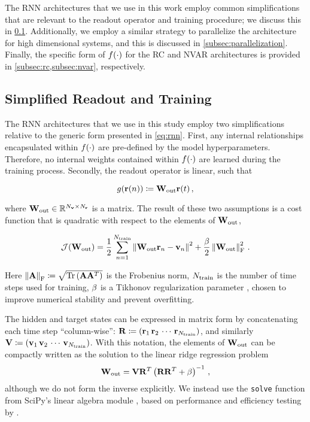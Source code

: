 The RNN architectures that we use in this work employ common
simplifications that are relevant to the readout operator and training
procedure; we discuss this in \cref{subsec:readout}.
Additionally, we employ a similar strategy to parallelize the architecture for
high dimensional systems, and this is discussed in
\cref{subsec:parallelization}.
Finally, the specific form of $f(\cdot)$ for the RC and NVAR architectures
is provided in \cref{subsec:rc,subsec:nvar},
respectively.


\subsection{Simplified Readout and Training}
\label{subsec:readout}

The RNN architectures that we use in this study employ two
simplifications relative to the generic form presented in
\cref{eq:rnn}.
First, any internal relationships encapsulated within
$f(\cdot)$ are pre-defined by the model hyperparameters.
Therefore, no internal weights contained within $f(\cdot)$
are learned during the training process.
Secondly, the readout operator is linear, such that
\begin{linenomath*}\begin{equation*}
    g(\mathbf{r}(n)) \coloneqq \mathbf{W}_\text{out} \mathbf{r}(t) \, ,
\end{equation*}\end{linenomath*}
where $\mathbf{W}_\text{out} \in \mathbb{R}^{N_{\mathbf{v}}\times N_{\mathbf{r}}}$ is a matrix.
The result of these two assumptions is a cost function that is quadratic with
respect to the elements of $\mathbf{W}_\text{out}$,
\begin{linenomath*}\begin{equation}
    \mathcal{J}(\mathbf{W}_\text{out}) =
        \dfrac{1}{2}\sum_{n=1}^{N_\text{train}} \left\lVert\mathbf{W}_\text{out} \mathbf{r}_n - \mathbf{v}_n\right\rVert^2
        +
        \dfrac{\beta}{2}\left\lVert\mathbf{W}_\text{out}\right\rVert_\text{F}^2 \, .
    \label{eq:cost}
\end{equation}\end{linenomath*}
Here
$\left\lVert\mathbf{A}\right\rVert_\text{F} \coloneqq
\sqrt{\text{Tr}\left(\mathbf{A}\mathbf{A}^T\right)}$
is the Frobenius norm,
$N_\text{train}$ is the number of time steps used for training,
$\beta$ is a Tikhonov regularization parameter \citep{tikhonov_solution_1963}, chosen to improve
numerical stability and prevent overfitting.

The hidden and target states can be expressed in matrix form by concatenating
each time step ``column-wise'':
$\mathbf{R} \coloneqq (\mathbf{r}_1 \, \mathbf{r}_2 \, \cdots \, \mathbf{r}_{N_\text{train}})$,
and similarly
$\mathbf{V} \coloneqq (\mathbf{v}_1 \, \mathbf{v}_2 \, \cdots \, \mathbf{v}_{N_\text{train}})$.
With this notation, the elements of $\mathbf{W}_\text{out}$ can be compactly written as the
solution to the linear ridge regression problem
\begin{equation}
    \mathbf{W}_\text{out} = \mathbf{V} \mathbf{R}^T \left(\mathbf{R}\mathbf{R}^T + \beta\right)^{-1} \, ,
    \label{eq:ridge_regression}
\end{equation}
although we do not form the inverse explicitly.
We instead use the \texttt{solve} function from SciPy's linear algebra module
\citep{scipy_2020}, based on performance and efficiency testing by
\citet{platt_systematic_2022}.


